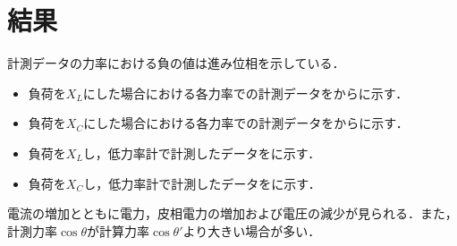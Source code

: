 \clearpage
\section{結果}
計測データの力率における負の値は進み位相を示している．
\begin{itemize}
	\item 負荷を$X_{L}$にした場合における各力率での計測データをからに示す．
	\item 負荷を$X_{C}$にした場合における各力率での計測データをからに示す．
	\item 負荷を$X_{L}$し，低力率計で計測したデータをに示す．
	\item 負荷を$X_{C}$し，低力率計で計測したデータをに示す．
\end{itemize}
	電流の増加とともに電力，皮相電力の増加および電圧の減少が見られる．また，計測力率$\cos \theta$が計算力率$\cos \theta '$より大きい場合が多い．
	
